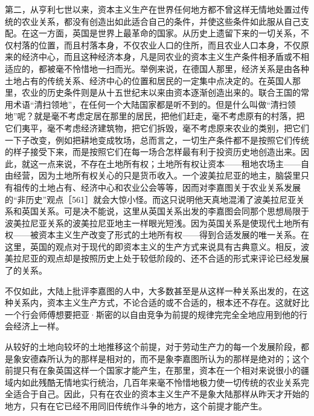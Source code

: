 第二，从亨利七世以来，资本主义生产在世界任何地方都不曾这样无情地处置过传统的农业关系，都没有创造出如此适合自己的条件，并使这些条件如此服从自己支配。在这一方面，英国是世界上最革命的国家。从历史上遗留下来的一切关系，不仅村落的位置，而且村落本身，不仅农业人口的住所，而且农业人口本身，不仅原来的经济中心，而且这种经济本身，凡是同农业的资本主义生产条件相矛盾或不相适应的，都被毫不怜惜地一扫而光。举例来说，在德国人那里，经济关系是由各种土地占有的传统关系、经济中心的位置和居民的一定集中点决定的。在英国人那里，农业的历史条件则是从十五世纪末以来由资本逐渐创造出来的。联合王国的常用术语“清扫领地”，在任何一个大陆国家都是听不到的。但是什么叫做“清扫领地”呢？就是毫不考虑定居在那里的居民，把他们赶走，毫不考虑原有的村落，把它们夷平，毫不考虑经济建筑物，把它们拆毁，毫不考虑原来农业的类别，把它们一下子改变，例如把耕地变成牧场，总而言之，一切生产条件都不是按照它们传统的样子接受下来，而是按照它们在每一场合怎样最有利于投资历史地创造出来。因此，就这一点来说，不存在土地所有权；土地所有权让资本——租地农场主——自由经营，因为土地所有权关心的只是货币收入。一个波美拉尼亚的地主，脑袋里只有祖传的土地占有、经济中心和农业公会等等，因而对李嘉图关于农业关系发展的“非历史”观点［561］就会大惊小怪。而这只说明他天真地混淆了波美拉尼亚关系和英国关系。可是决不能说，这里从英国关系出发的李嘉图会同那个思想局限于波美拉尼亚关系的波美拉尼亚地主一样眼光短浅。因为英国关系是使现代土地所有权——被资本主义生产改变了形式的土地所有权——得到合适发展的唯一关系。在这里，英国的观点对于现代的即资本主义的生产方式来说具有古典意义。相反，波美拉尼亚的观点却是按照历史上处于较低阶段的、还不合适的形式来评论已经发展了的关系。

不仅如此，大陆上批评李嘉图的人中，大多数甚至是从这样一种关系出发的，在这种关系内，资本主义生产方式，不论合适的或不合适的，根本还不存在。这就好比一个行会师傅想要把亚·斯密的以自由竞争为前提的规律完完全全地应用到他的行会经济上一样。

从较好的土地向较坏的土地推移这个前提，对于劳动生产力的每一个发展阶段，都是象安德森所认为的那样是相对的，而不是象李嘉图所认为的那样是绝对的；这个前提只有在象英国这样一个国家才能产生，在那里，资本在一个相对来说很小的疆域内如此残酷无情地实行统治，几百年来毫不怜惜地极力使一切传统的农业关系完全适合于自己。因此，只有在农业的资本主义生产不是象大陆那样从昨天才开始的地方，只有在它已经不用同旧传统作斗争的地方，这个前提才能产生。

